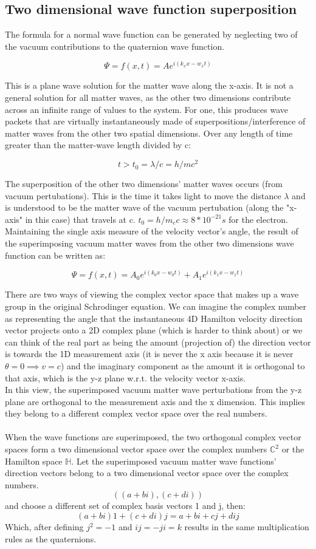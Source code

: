 \documentclass{article}
\begin{document}
\subsection{Two dimensional wave function superposition}

The formula for a normal wave function can be generated by neglecting two of the vacuum contributions to the quaternion wave function.

$$\Psi=f(x,t)=A e^{i(k_x x-w_x t)}$$

This is a plane wave solution for the matter wave along the x-axis. It is not a general solution for all matter waves, as the other two dimensions contribute across an infinite range of values to the system. For one, this produces wave packets that are virtually instantaneously made of superpositions/interference of matter waves from the other two spatial dimensions. Over any length of time greater than the matter-wave length divided by c: 

$$t>t_0=\lambda /c=h/mc^2$$

The superposition of the other two dimensions' matter waves occurs (from vacuum pertubations). This is the time it takes light to move the distance $\lambda$ and is understood to be the matter wave of the vacuum pertubation (along the "x-axis" in this case) that travels at c. $t_0=h/m_e c \approx 8*10^{-21}s$ for the electron. Maintaining the single axis measure of the velocity vector's angle, the result of the superimposing vacuum matter waves from the other two dimensions wave function can be written as:

$$\Psi=f(x,t)=A_0 e^{i(k_0 x-w_0 t)}+A_1e^{i(k_1 x-w_1 t)}$$

There are two ways of viewing the complex vector space that makes up a wave group in the original Schrodinger equation. We can imagine the complex number as representing the angle that the instantaneous 4D Hamilton velocity direction vector projects onto a 2D complex plane (which is harder to think about) or we can think of the real part as being the amount (projection of) the direction vector is towards the 1D measurement axis (it is never the x axis because it is never $\theta = 0 \implies v=c$) and the imaginary component as the amount it is orthogonal to that axis, which is the y-z plane w.r.t. the velocity vector x-axis.\\
In this view, the superimposed vacuum matter wave perturbations from the y-z plane are orthogonal to the measurement axis and the x dimension. This implies they belong to a different complex vector space over the real numbers.\\
\\
When the wave functions are superimposed, the two orthogonal complex vector spaces form a two dimensional vector space over the complex numbers $\mathbb{C}^2$ or the Hamilton space $\mathbb{H}$. Let the superimposed vacuum matter wave functions' direction vectors belong to a two dimensional vector space over the complex numbers.
$$((a+bi),(c+di))$$
and choose a different set of complex basis vectors 1 and j, then:
$$(a+bi)1+(c+di)j = a+bi+cj+dij$$
Which, after defining $j^2=-1$ and $ij=-ji=k$ results in the same multiplication rules as the quaternions.\\
\end{document}
